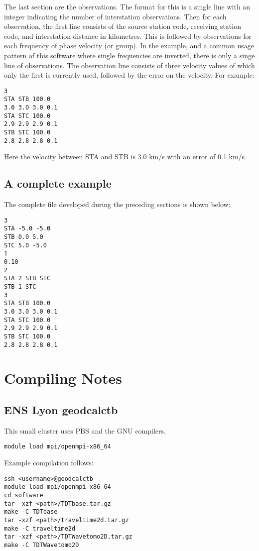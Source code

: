 \documentclass[a4paper,12pt]{article}
\begin{document}
The last section are the observations. The format for this is a single line with an
integer indicating the number of interstation observations. Then for each observation,
the first line consists of the source station code, receiving station code, and interstation
distance in kilometres. This is followed by observations for each frequency of phase velocity
(or group). In the example, and a common usage pattern of this software where single frequencies
are inverted, there is only a singe line of observations. The observation line consists of three velocity
values of which only the first is currently used, followed by the error on the velocity. For example:

\begin{verbatim}
3
STA STB 100.0
3.0 3.0 3.0 0.1
STA STC 100.0
2.9 2.9 2.9 0.1
STB STC 100.0
2.8 2.8 2.8 0.1
\end{verbatim}

Here the velocity between STA and STB is 3.0 km/s with an error of 0.1 km/s.

\subsection{A complete example}

The complete file developed during the preceding sections is shown below:

\begin{verbatim}
3
STA -5.0 -5.0
STB 0.0 5.0
STC 5.0 -5.0
1
0.10
2
STA 2 STB STC
STB 1 STC
3
STA STB 100.0
3.0 3.0 3.0 0.1
STA STC 100.0
2.9 2.9 2.9 0.1
STB STC 100.0
2.8 2.8 2.8 0.1
\end{verbatim}

\section{Compiling Notes}

\subsection{ENS Lyon geodcalctb}

This small cluster uses PBS and the GNU compilers.

\begin{verbatim}
module load mpi/openmpi-x86_64
\end{verbatim}

Example compilation follows:

\begin{verbatim}
ssh <username>@geodcalctb
module load mpi/openmpi-x86_64
cd software
tar -xzf <path>/TDTbase.tar.gz
make -C TDTbase
tar -xzf <path>/traveltime2d.tar.gz
make -C traveltime2d
tar -xzf <path>/TDTWavetomo2D.tar.gz
make -C TDTWavetomo2D
\end{verbatim}
\end{document}
